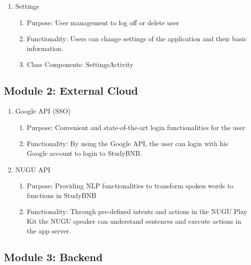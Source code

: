 \documentclass[conference]{IEEEtran}
\begin{document}
\begin{enumerate}
    \item Settings
    \begin{enumerate}
        \item Purpose: User management to log off or delete user
        \item Functionality: Users can change settings of the application and their basic information.
        \item Class Components: SettingsActivity
    \end{enumerate}
\end{enumerate}

\subsection{Module 2: External Cloud}

\begin{enumerate}
    \item Google API (SSO)
    \begin{enumerate}
        \item Purpose: Convenient and state-of-the-art login functionalities for the user
        \item Functionality: By using the Google API, the user can login with his Google account to login to StudyBNB. 
    \end{enumerate}
    
    \item NUGU API
    \begin{enumerate}
        \item Purpose: Providing NLP functionalities to transform spoken words to functions in StudyBNB
        \item Functionality: Through pre-defined intents and actions in the NUGU Play Kit the NUGU speaker can understand sentences and execute actions in the app server.
    \end{enumerate}
\end{enumerate}

\subsection{Module 3: Backend}
\end{document}
